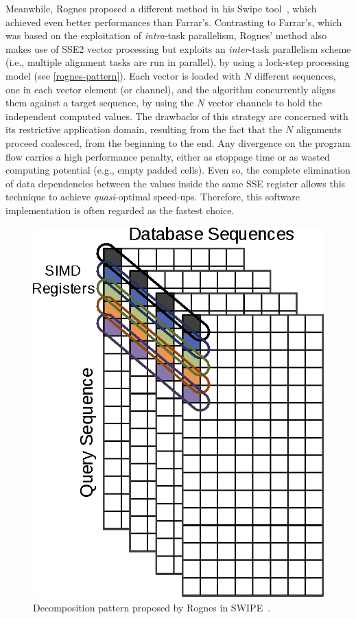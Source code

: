 \documentclass{bmcart}
\begin{document}
Meanwhile, Rognes proposed a different method in his Swipe tool~\cite{rognes}, which achieved even better performances than Farrar's. Contrasting to Farrar's, which was based on the exploitation of \textit{intra}-task parallelism, Rognes' method also makes use of SSE2 vector processing but exploits an \textit{inter}-task parallelism scheme (i.e., multiple alignment tasks are run in parallel), by using a lock-step processing
model (see \autoref{rognes-pattern}). Each vector is loaded with $N$ different sequences, one in each vector element (or channel), and the algorithm concurrently aligns them against a target sequence, by using the $N$ vector channels to hold the independent computed values. The drawbacks of this strategy are concerned with its restrictive application domain, resulting from the fact that the $N$ alignments proceed coalesced, from the beginning to the end. Any divergence on the program flow carries a high performance penalty, either as stoppage time or as wasted computing potential (e.g., empty padded cells). Even so, the complete elimination of data dependencies between the values inside the same SSE register allows this technique to achieve \textit{quasi}-optimal speed-ups. Therefore, this software implementation is often regarded as the fastest choice.

\begin{figure}[h!]
  \centering
  \includegraphics{img/rognes-pattern.eps}
  \caption{Decomposition pattern proposed by Rognes in SWIPE~\cite{rognes}.}
  \label{rognes-pattern}
\end{figure}
\end{document}

